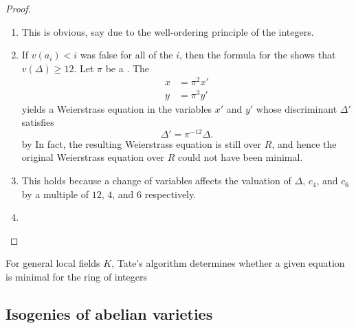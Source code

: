 \begin{proof}
    \begin{enumerate}
        \item This is obvious, say due to the well-ordering principle of the integers.

        \item If $v(a_i) < i$ was false for all of the $i$, then the formula for the  shows that $v(\Delta) \geq 12$. Let $\pi$ be a . The 
        \begin{align*}
        x &= \pi^2 x' \\
        y &= \pi^3 y'
        \end{align*}
        yields a Weierstrass equation in the variables $x'$ and $y'$ whose discriminant $\Delta'$ satisfies
        $$\Delta' = \pi^{-12} \Delta.$$
        by  In fact, the resulting Weierstrass equation is still over $R$, and hence the original Weierstrass equation over $R$ could not have been minimal. 

        \item This holds because a change of variables affects the valuation of $\Delta$, $c_4$, and $c_6$ by a multiple of $12$, $4$, and $6$ respectively.

        \item \TODO{}

    \end{enumerate}
\end{proof}

For general local fields $K$, Tate's algorithm determines whether a given equation is minimal for the ring of integers 




\subsection{Isogenies of abelian varieties}




